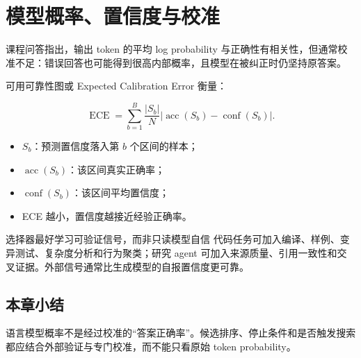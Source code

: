 \section{模型概率、置信度与校准}

课程问答指出，输出 token 的平均 log probability 与正确性有相关性，但通常校准不足：错误回答也可能得到很高内部概率，且模型在被纠正时仍坚持原答案。

可用可靠性图或 Expected Calibration Error 衡量：

$$
\operatorname{ECE}=\sum_{b=1}^{B}\frac{|S_b|}{N}
\left|\operatorname{acc}(S_b)-\operatorname{conf}(S_b)\right|.
$$

\begin{itemize}
    \item $S_b$：预测置信度落入第 $b$ 个区间的样本；
    \item $\operatorname{acc}(S_b)$：该区间真实正确率；
    \item $\operatorname{conf}(S_b)$：该区间平均置信度；
    \item ECE 越小，置信度越接近经验正确率。
\end{itemize}

\begin{knowledgebox}{选择器最好学习可验证信号，而非只读模型自信}
代码任务可加入编译、样例、变异测试、复杂度分析和行为聚类；研究 agent 可加入来源质量、引用一致性和交叉证据。外部信号通常比生成模型的自报置信度更可靠。
\end{knowledgebox}

\subsection{本章小结}

语言模型概率不是经过校准的“答案正确率”。候选排序、停止条件和是否触发搜索都应结合外部验证与专门校准，而不能只看原始 token probability。


